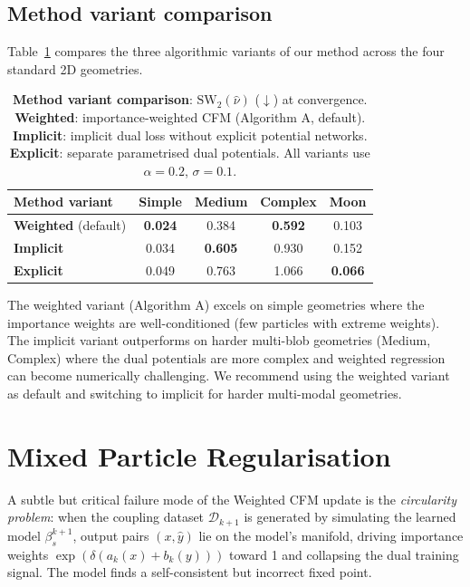 \documentclass[11pt]{article}
\theoremstyle{definition}
\numberwithin{equation}{section}%
\begin{document}
\subsection{Method variant comparison}

Table~\ref{tab:variant_ablation} compares the three algorithmic variants of
our method across the four standard 2D geometries.

\begin{table}[ht]
\centering
\caption{\textbf{Method variant comparison}:
  $\mathrm{SW}_2(\hat\nu)$ ($\downarrow$) at convergence.
  \textbf{Weighted}: importance-weighted CFM (Algorithm A, default).
  \textbf{Implicit}: implicit dual loss without explicit potential networks.
  \textbf{Explicit}: separate parametrised dual potentials.
  All variants use $\alpha\!=\!0.2$, $\sigma\!=\!0.1$.}
\label{tab:variant_ablation}
\vspace{2pt}
\setlength{\tabcolsep}{6pt}
\begin{tabular}{lcccc}
\toprule
Method variant & Simple & Medium & Complex & Moon \\
\midrule
\textbf{Weighted} (default) & \textbf{0.024} & 0.384 & \textbf{0.592} & 0.103 \\
\textbf{Implicit}           & 0.034 & \textbf{0.605} & 0.930 & 0.152 \\
\textbf{Explicit}           & 0.049    & 0.763    & 1.066 & \textbf{0.066} \\
\bottomrule
\end{tabular}
\end{table}

The weighted variant (Algorithm A) excels on simple geometries where the
importance weights are well-conditioned (few particles with extreme weights).
The implicit variant outperforms on harder multi-blob geometries (Medium,
Complex) where the dual potentials are more complex and weighted regression
can become numerically challenging.
We recommend using the weighted variant as default and switching to implicit
for harder multi-modal geometries.

% 
\section{Mixed Particle Regularisation}
\label{app:mixed-particle}
% 

A subtle but critical failure mode of the Weighted CFM update is the
\emph{circularity problem}: when the coupling dataset $\mathcal{D}_{k+1}$
is generated by simulating the learned model $\beta^{k+1}_s$, output pairs
$(x, \hat{y})$ lie on the model's manifold, driving importance weights
$\exp(\delta(a_k(x)+b_k(y)))$ toward 1 and collapsing the dual training
signal.
The model finds a self-consistent but incorrect fixed point.
\end{document}
